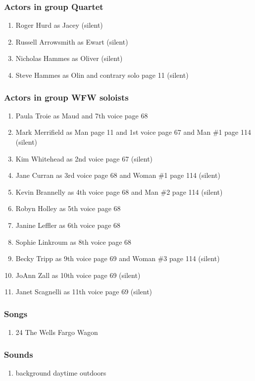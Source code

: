 \subsubsection{Actors in group Quartet}
\begin{enumerate}
\item Roger Hurd as Jacey (silent)
\item Russell Arrowsmith as Ewart (silent)
\item Nicholas Hammes as Oliver (silent)
\item Steve Hammes as Olin and contrary solo page 11 (silent)
\end{enumerate}
\subsubsection{Actors in group WFW soloists}
\begin{enumerate}
\item Paula Troie as Maud and 7th voice page 68
\item Mark Merrifield as Man page 11 and 1st voice page 67 and Man \#1 page 114 (silent)
\item Kim Whitehead as 2nd voice page 67 (silent)
\item Jane Curran as 3rd voice page 68 and Woman \#1 page 114 (silent)
\item Kevin Brannelly as 4th voice page 68 and Man \#2 page 114 (silent)
\item Robyn Holley as 5th voice page 68
\item Janine Leffler as 6th voice page 68
\item Sophie Linkroum as 8th voice page 68
\item Becky Tripp as 9th voice page 69 and Woman \#3 page 114 (silent)
\item JoAnn Zall as 10th voice page 69 (silent)
\item Janet Scagnelli as 11th voice page 69 (silent)
\end{enumerate}

\subsubsection{Songs}
\begin{enumerate}
\item 24 The Wells Fargo Wagon
\end{enumerate}\subsubsection{Sounds}
\begin{enumerate}
\item background daytime outdoors
\end{enumerate}
